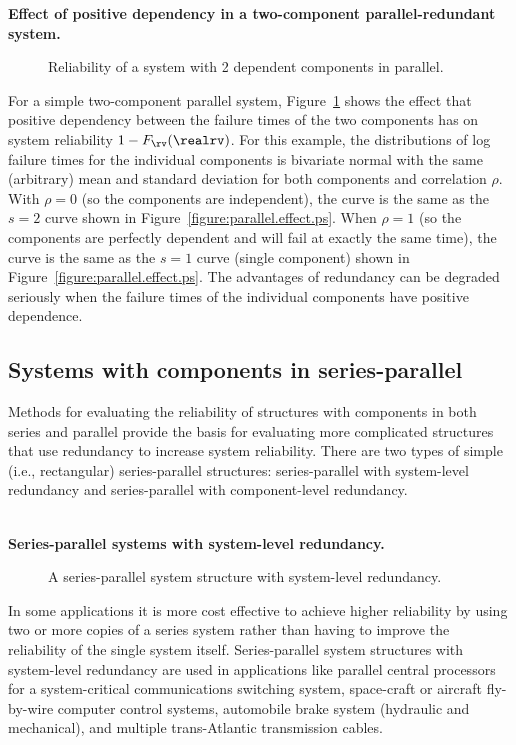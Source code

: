\noindent
{\bf Effect of positive dependency in a two-component
parallel-redundant system.}
\begin{figure}
\caption{Reliability of a system with 2 dependent
components in parallel.}
\label{figure:parallel.dep.effect.ps}
\end{figure}
For a simple two-component parallel system,
Figure~\ref{figure:parallel.dep.effect.ps} shows the effect that
positive dependency between the failure times of the two components
has on system reliability $1-F_{\rv}(\realrv)$.
For this example, the distributions of log failure times for the
individual components is bivariate normal with the same (arbitrary)
mean and standard deviation for both components and correlation
$\rho$. With $\rho=0$ (so the components are independent), the curve
is the same as the $s=2$ curve shown in
Figure~\ref{figure:parallel.effect.ps}. When $\rho=1$ (so the
components are perfectly dependent and will fail at exactly the same
time), the curve is the same as the $s=1$ curve (single component) shown in
Figure~\ref{figure:parallel.effect.ps}. The advantages of redundancy
can be degraded seriously when the failure times of the individual
components have positive dependence.

\subsection{Systems with components in series-parallel}
\label{section:series.parallel}
Methods for evaluating the reliability of structures with components
in both series and parallel provide the basis for evaluating more
complicated structures that use redundancy to increase system
reliability.  There are two types of simple (i.e., rectangular)
series-parallel structures: series-parallel with system-level
redundancy and series-parallel with component-level redundancy.

\mbox{ }\\
\noindent
{\bf Series-parallel systems with system-level redundancy.}
\begin{figure}
\caption{A 
series-parallel system structure with system-level redundancy.}
\label{figure:system.sysredunfig.ps}
\end{figure}
In some applications it is more cost effective to achieve higher
reliability by using two or more copies of a series system rather
than having to improve the reliability of the single system itself.
Series-parallel system structures with system-level redundancy are
used in applications like parallel central processors for a
system-critical communications switching system, space-craft or
aircraft fly-by-wire computer control systems, automobile brake
system (hydraulic and mechanical), and multiple trans-Atlantic
transmission cables.

